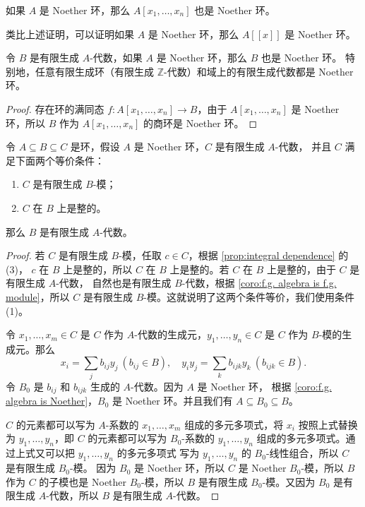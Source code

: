 \begin{corollary}
  如果 $A$ 是 Noether 环，那么 $A[x_1,\dots,x_n]$ 也是 Noether 环。
\end{corollary}

\begin{remark}
  类比上述证明，可以证明如果 $A$ 是 Noether 环，那么 $A[[x]]$ 是 Noether 环。
\end{remark}

\begin{corollary}\label{coro:f.g. algebra is Noether}
  令 $B$ 是有限生成 $A$-代数，如果 $A$ 是 Noether 环，那么 $B$ 也是 Noether 环。
  特别地，任意有限生成环（有限生成 $\mathbb{Z}$-代数）和域上的有限生成代数都是 Noether 环。
\end{corollary}
\begin{proof}
  存在环的满同态 $f:A[x_1,\dots,x_n]\to B$，由于 $A[x_1,\dots,x_n]$ 是 Noether 环，所以
  $B$ 作为 $A[x_1,\dots,x_n]$ 的商环是 Noether 环。
\end{proof}

\begin{proposition}\label{prop:Artin-Tate}
  令 $A\subseteq B\subseteq C$ 是环，假设 $A$ 是 Noether 环，$C$ 是有限生成 $A$-代数，
  并且 $C$ 满足下面两个等价条件：
  \begin{enumerate}
    \item $C$ 是有限生成 $B$-模；
    \item $C$ 在 $B$ 上是整的。
  \end{enumerate}
  那么 $B$ 是有限生成 $A$-代数。
\end{proposition}
\begin{proof}
  若 $C$ 是有限生成 $B$-模，任取 $c\in C$，根据 \autoref{prop:integral dependence} 的 (3)，
  $c$ 在 $B$ 上是整的，所以 $C$ 在 $B$ 上是整的。若 $C$ 在 $B$ 上是整的，由于 $C$ 是有限生成 $A$-代数，
  自然也是有限生成 $B$-代数，根据 \autoref{coro:f.g. algebra is f.g. module}，所以 $C$
  是有限生成 $B$-模。这就说明了这两个条件等价，我们使用条件 (1)。

  令 $x_1,\dots,x_m\in C$ 是 $C$ 作为 $A$-代数的生成元，$y_1,\dots,y_n\in C$ 是 $C$ 作为
  $B$-模的生成元。那么
  \[
    x_i=\sum_j b_{ij}y_j\ (b_{ij}\in B),\quad y_iy_j=\sum_k b_{ijk}y_k\ (b_{ijk}\in B).
  \]
  令 $B_0$ 是 $b_{ij}$ 和 $b_{ijk}$ 生成的 $A$-代数。因为 $A$ 是 Noether 环，
  根据 \autoref{coro:f.g. algebra is Noether}，$B_0$ 是 Noether 环。并且我们有
  $A\subseteq B_0\subseteq B$。

  $C$ 的元素都可以写为 $A$-系数的 $x_1,\dots,x_m$ 组成的多元多项式，将 $x_i$
  按照上式替换为 $y_1,\dots,y_n$，即 $C$ 的元素都可以写为 $B_0$-系数的
  $y_1,\dots,y_n$ 组成的多元多项式。通过上式又可以把 $y_1,\dots,y_n$ 的多元多项式
  写为 $y_1,\dots,y_n$ 的 $B_0$-线性组合，所以 $C$ 是有限生成 $B_0$-模。
  因为 $B_0$ 是 Noether 环，所以 $C$ 是 Noether $B_0$-模，所以 $B$ 作为 $C$
  的子模也是 Noether $B_0$-模，所以 $B$ 是有限生成 $B_0$-模。又因为 $B_0$
  是有限生成 $A$-代数，所以 $B$ 是有限生成 $A$-代数。
\end{proof}


